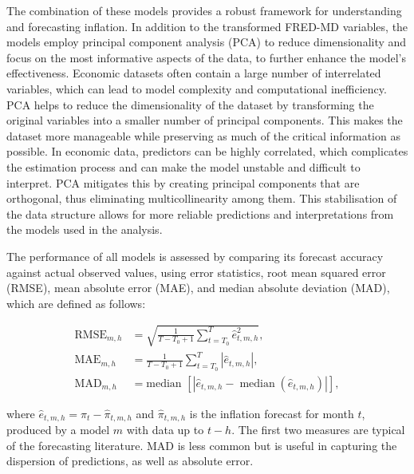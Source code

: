 The combination of these models provides a robust framework for understanding and forecasting inflation. In addition to the transformed FRED-MD variables, the models employ principal component analysis (PCA) to reduce dimensionality and focus on the most informative aspects of the data, to further enhance the model's effectiveness. Economic datasets often contain a large number of interrelated variables, which can lead to model complexity and computational inefficiency. PCA helps to reduce the dimensionality of the dataset by transforming the original variables into a smaller number of principal components. This makes the dataset more manageable while preserving as much of the critical information as possible. In economic data, predictors can be highly correlated, which complicates the estimation process and can make the model unstable and difficult to interpret. PCA mitigates this by creating principal components that are orthogonal, thus eliminating multicollinearity among them. This stabilisation of the data structure allows for more reliable predictions and interpretations from the models used in the analysis.

The performance of all models is assessed by comparing its forecast accuracy against actual observed values, using error statistics, root mean squared error (RMSE), mean absolute error (MAE), and median absolute deviation (MAD), which are defined as follows:

\begin{equation}
\label{eq:errors}
\begin{aligned}
\operatorname{RMSE}_{m, h} &= \sqrt{\frac{1}{T-T_0+1} \sum_{t=T_0}^T \widehat{e}_{t, m, h}^2}, \\
\operatorname{MAE}_{m, h} &= \frac{1}{T-T_0+1} \sum_{t=T_0}^T\left|\widehat{e}_{t, m, h}\right|, \\
\mathrm{MAD}_{m, h} &= \text{median }\left[\left|\widehat{e}_{t, m, h}-\operatorname{median}\left(\widehat{e}_{t, m, h}\right)\right|\right],
\end{aligned}
\end{equation}


where $\widehat{e}_{t, m, h}=\pi_t-\widehat{\pi}_{t, m, h}$ and $\widehat{\pi}_{t, m, h}$ is the inflation forecast for month $t$, produced by a model $m$ with data up to $t-h$. The first two measures are typical of the forecasting literature. MAD is less common but is useful in capturing the dispersion of predictions, as well as absolute error.



